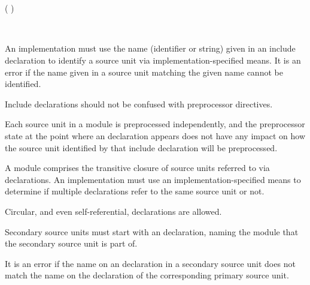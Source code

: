 \begin{Syntax}
     \\
          \code{;}

     \\
         (   )\SynStar

     \\
        \SynOr {}
\end{Syntax}

An implementation must use the name (identifier or string) given in an include declaration to identify a source unit via implementation-specified means.
It is an error if the name given in a source unit matching the given name cannot be identified.

\begin{Note}
Include declarations should not be confused with preprocessor  directives.

Each source unit in a module is preprocessed independently, and the preprocessor state at the point where an  declaration appears does not have any impact on how the source unit identified by that include declaration will be preprocessed.
\end{Note}

A module comprises the transitive closure of source units referred to via  declarations.
An implementation must use an implementation-specified means to determine if multiple  declarations refer to the same source unit or not.

\begin{Note}
Circular, and even self-referential,  declarations are allowed.
\end{Note}


Secondary source units must start with an  declaration, naming the module that the secondary source unit is part of.

\begin{Syntax}
      \code{;}
\end{Syntax}

\begin{Note}
It is an error if the name on an  declaration in a secondary source unit does not match the name on the  declaration of the corresponding primary source unit.
\end{Note}

